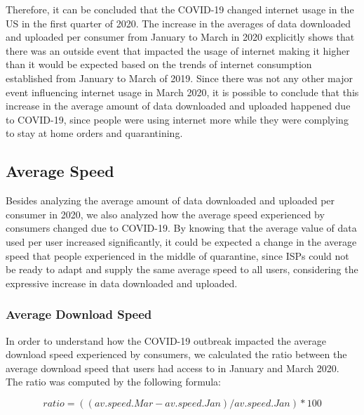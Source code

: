 \documentclass[conference,10pt]{IEEEtran}
\begin{document}
Therefore, it can be concluded that the COVID-19 changed internet usage in the US in the first quarter of 2020. The increase in the averages of data downloaded and uploaded per consumer from January to March in 2020 explicitly shows that there was an outside event that impacted the usage of internet making it higher than it would be expected based on the trends of internet consumption established from January to March of 2019. Since there was not any other major event influencing internet usage in March 2020, it is possible to conclude that this increase in the average amount of data downloaded and uploaded happened due to COVID-19, since people were using internet more while they were complying to stay at home orders and quarantining.

\subsection{Average Speed}
\label{sec:average-speed}
Besides analyzing the average amount of data downloaded and uploaded per consumer in 2020, we also analyzed how the average speed experienced by consumers changed due to COVID-19. By knowing that the average value of data used per user increased significantly, it could be expected a change in the average speed that people experienced in the middle of quarantine, since ISPs could not be ready to adapt and supply the same average speed to all users, considering the expressive increase in data downloaded and uploaded.

\subsubsection{Average Download Speed}
\label{sec:average-download-speed}

In order to understand how the COVID-19 outbreak impacted the average download speed experienced by consumers, we calculated the ratio between the average download speed that users had access to in January and March 2020. The ratio was computed by the following formula:

\begin{equation}
ratio= ((av.speed.Mar - av.speed.Jan)/ av.speed.Jan)*100
\end{equation}
\end{document}
